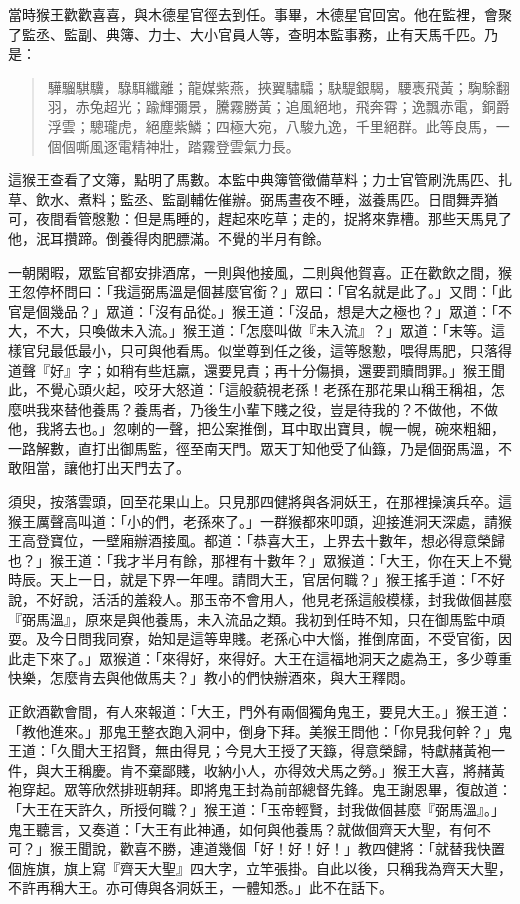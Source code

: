 當時猴王歡歡喜喜，與木德星官徑去到任。事畢，木德星官回宮。他在監裡，會聚了監丞、監副、典簿、力士、大小官員人等，查明本監事務，止有天馬千匹。乃是：
\begin{quote}
驊騮騏驥，騄駬纖離；龍媒紫燕，挾翼驌驦；駃騠銀騔，騕褭飛黃；騊駼翻羽，赤兔超光；踰輝彌景，騰霧勝黃；追風絕地，飛奔霄；逸飄赤電，銅爵浮雲；驄瓏虎，絕塵紫鱗；四極大宛，八駿九逸，千里絕群。此等良馬，一個個嘶風逐電精神壯，踏霧登雲氣力長。
\end{quote}

這猴王查看了文簿，點明了馬數。本監中典簿管徵備草料；力士官管刷洗馬匹、扎草、飲水、煮料；監丞、監副輔佐催辦。弼馬晝夜不睡，滋養馬匹。日間舞弄猶可，夜間看管慇懃：但是馬睡的，趕起來吃草；走的，捉將來靠槽。那些天馬見了他，泯耳攢蹄。倒養得肉肥膘滿。不覺的半月有餘。

一朝閑暇，眾監官都安排酒席，一則與他接風，二則與他賀喜。正在歡飲之間，猴王忽停杯問曰：「我這弼馬溫是個甚麼官銜？」眾曰：「官名就是此了。」又問：「此官是個幾品？」眾道：「沒有品從。」猴王道：「沒品，想是大之極也？」眾道：「不大，不大，只喚做未入流。」猴王道：「怎麼叫做『未入流』？」眾道：「末等。這樣官兒最低最小，只可與他看馬。似堂尊到任之後，這等慇懃，喂得馬肥，只落得道聲『好』字；如稍有些尪羸，還要見責；再十分傷損，還要罰贖問罪。」猴王聞此，不覺心頭火起，咬牙大怒道：「這般藐視老孫！老孫在那花果山稱王稱祖，怎麼哄我來替他養馬？養馬者，乃後生小輩下賤之役，豈是待我的？不做他，不做他，我將去也。」忽喇的一聲，把公案推倒，耳中取出寶貝，幌一幌，碗來粗細，一路解數，直打出御馬監，徑至南天門。眾天丁知他受了仙籙，乃是個弼馬溫，不敢阻當，讓他打出天門去了。

須臾，按落雲頭，回至花果山上。只見那四健將與各洞妖王，在那裡操演兵卒。這猴王厲聲高叫道：「小的們，老孫來了。」一群猴都來叩頭，迎接進洞天深處，請猴王高登寶位，一壁廂辦酒接風。都道：「恭喜大王，上界去十數年，想必得意榮歸也？」猴王道：「我才半月有餘，那裡有十數年？」眾猴道：「大王，你在天上不覺時辰。天上一日，就是下界一年哩。請問大王，官居何職？」猴王搖手道：「不好說，不好說，活活的羞殺人。那玉帝不會用人，他見老孫這般模樣，封我做個甚麼『弼馬溫』，原來是與他養馬，未入流品之類。我初到任時不知，只在御馬監中頑耍。及今日問我同寮，始知是這等卑賤。老孫心中大惱，推倒席面，不受官銜，因此走下來了。」眾猴道：「來得好，來得好。大王在這福地洞天之處為王，多少尊重快樂，怎麼肯去與他做馬夫？」教小的們快辦酒來，與大王釋悶。

正飲酒歡會間，有人來報道：「大王，門外有兩個獨角鬼王，要見大王。」猴王道：「教他進來。」那鬼王整衣跑入洞中，倒身下拜。美猴王問他：「你見我何幹？」鬼王道：「久聞大王招賢，無由得見；今見大王授了天籙，得意榮歸，特獻赭黃袍一件，與大王稱慶。肯不棄鄙賤，收納小人，亦得效犬馬之勞。」猴王大喜，將赭黃袍穿起。眾等欣然排班朝拜。即將鬼王封為前部總督先鋒。鬼王謝恩畢，復啟道：「大王在天許久，所授何職？」猴王道：「玉帝輕賢，封我做個甚麼『弼馬溫』。」鬼王聽言，又奏道：「大王有此神通，如何與他養馬？就做個齊天大聖，有何不可？」猴王聞說，歡喜不勝，連道幾個「好！好！好！」教四健將：「就替我快置個旌旗，旗上寫『齊天大聖』四大字，立竿張掛。自此以後，只稱我為齊天大聖，不許再稱大王。亦可傳與各洞妖王，一體知悉。」此不在話下。

